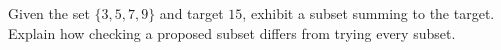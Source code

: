 Given the set $\{3,5,7,9\}$ and target $15$, exhibit a subset summing to the target. Explain how checking a proposed subset differs from trying every subset.
